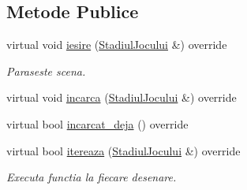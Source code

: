 \subsection*{Metode Publice}
\begin{DoxyCompactItemize}
\item 
\mbox{\label{classJoc_ad0030f6756f45c5ac98a61d8094bf60e}} 
virtual void \hyperlink{classJoc_ad0030f6756f45c5ac98a61d8094bf60e}{iesire} (\hyperlink{classStadiulJocului}{Stadiul\+Jocului} \&) override
\begin{DoxyCompactList}\small\item\em Paraseste scena. \end{DoxyCompactList}\item 
virtual void \hyperlink{classJoc_a54976207efdeeb45b42fd639215b65e3}{incarca} (\hyperlink{classStadiulJocului}{Stadiul\+Jocului} \&) override
\item 
virtual bool \hyperlink{classJoc_ac78ae0ddb45250af612eb68de253861e}{incarcat\+\_\+deja} () override
\item 
virtual bool \hyperlink{classJoc_a5b8d52f928137512921eee184ca04fec}{itereaza} (\hyperlink{classStadiulJocului}{Stadiul\+Jocului} \&) override
\begin{DoxyCompactList}\small\item\em Executa functia la fiecare \textquotesingle{}desenare\textquotesingle{}. \end{DoxyCompactList}\end{DoxyCompactItemize}
